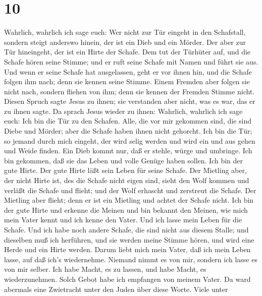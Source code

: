 \hypertarget{section-9}{%
\section{10}\label{section-9}}

 Wahrlich, wahrlich ich sage euch: Wer nicht zur Tür eingeht
in den Schafstall, sondern steigt anderswo hinein, der ist ein Dieb und
ein Mörder.  Der aber zur Tür hineingeht, der ist ein Hirte
der Schafe.  Dem tut der Türhüter auf, und die Schafe hören
seine Stimme; und er ruft seine Schafe mit Namen und führt sie aus.
 Und wenn er seine Schafe hat ausgelassen, geht er vor ihnen
hin, und die Schafe folgen ihm nach; denn sie kennen seine Stimme.
 Einem Fremden aber folgen sie nicht nach, sondern fliehen
von ihm; denn sie kennen der Fremden Stimme nicht.  Diesen
Spruch sagte Jesus zu ihnen; sie verstanden aber nicht, was es war, das
er zu ihnen sagte.  Da sprach Jesus wieder zu ihnen:
Wahrlich, wahrlich ich sage euch: Ich bin die Tür zu den Schafen.
 Alle, die vor mir gekommen sind, die sind Diebe und Mörder;
aber die Schafe haben ihnen nicht gehorcht.  Ich bin die
Tür; so jemand durch mich eingeht, der wird selig werden und wird ein
und aus gehen und Weide finden.  Ein Dieb kommt nur, daß er
stehle, würge und umbringe.  Ich bin gekommen, daß sie das
Leben und volle Genüge haben sollen.  Ich bin der gute
Hirte. Der gute Hirte läßt sein Leben für seine Schafe. Der Mietling
aber, der nicht Hirte ist, des die Schafe nicht eigen sind, sieht den
Wolf kommen und verläßt die Schafe und flieht; und der Wolf erhascht und
zerstreut die Schafe.  Der Mietling aber flieht; denn er
ist ein Mietling und achtet der Schafe nicht.  Ich bin der
gute Hirte und erkenne die Meinen und bin bekannt den Meinen,
 wie mich mein Vater kennt und ich kenne den Vater. Und ich
lasse mein Leben für die Schafe.  Und ich habe noch andere
Schafe, die sind nicht aus diesem Stalle; und dieselben muß ich
herführen, und sie werden meine Stimme hören, und wird eine Herde und
ein Hirte werden.  Darum liebt mich mein Vater, daß ich
mein Leben lasse, auf daß ich's wiedernehme.  Niemand nimmt
es von mir, sondern ich lasse es von mir selber. Ich habe Macht, es zu
lassen, und habe Macht, es wiederzunehmen. Solch Gebot habe ich
empfangen von meinem Vater.  Da ward abermals eine
Zwietracht unter den Juden über diese Worte.  Viele unter
